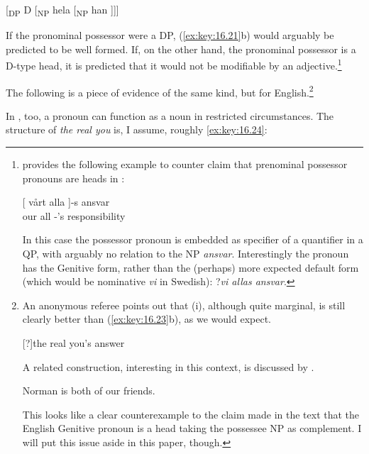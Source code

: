\documentclass[output=paper]{langsci/langscibook}
\begin{document}
\ea\label{ex:key:16.22}
    {}[\textsubscript{DP} D [\textsubscript{NP} hela [\textsubscript{NP} han ]]]
\z

If the pronominal possessor were a DP, (\ref{ex:key:16.21}b) would arguably be
predicted to be well formed. If, on the other hand, the pronominal possessor is
a D-type head, it is predicted that it would not be modifiable by an
adjective.\footnote{\citet[227--230]{Julien2005} provides the following example
    to counter  claim that prenominal possessor pronouns
    are heads in :

\begin{exe}
    \sn
	\gll {}[ vårt alla ]-s ansvar \\
        {} our  all \hphantom{]}-’s  responsibility\\
\end{exe}

In this case the possessor pronoun is embedded as specifier of a quantifier in
a QP, with arguably no relation to the NP \emph{ansvar}.  Interestingly the
pronoun has the Genitive form, rather than the (perhaps) more expected default
form (which would be nominative \emph{vi} in Swedish):
?\emph{vi allas ansvar}.}

The following is a piece of evidence of the same kind, but for
English.\footnote{An anonymous referee points out that (i), although quite
    marginal, is still clearly better than (\ref{ex:key:16.23}b), as we would expect.

\begin{exe}
    [?]{the real you’s answer}
\end{exe}

A related construction, interesting in this context, is discussed by
\textcite{TsoulasWoods2019}.

\begin{exe}
     Norman is both of our friends.
\end{exe}

This looks like a clear counterexample to the claim made in the text that the
English Genitive pronoun is a head taking the possessee NP as
complement. I will put this issue aside in this paper, though.}

\ea\label{ex:key:16.23}
	\z
\z

In , too, a pronoun can function as a noun in restricted circumstances.
The structure of \emph{the real you} is, I assume, roughly \eqref{ex:key:16.24}:
\end{document}
